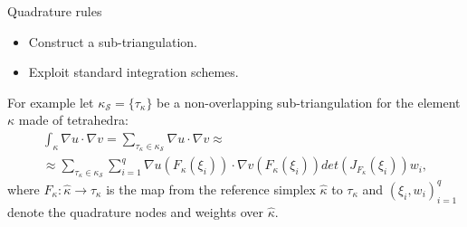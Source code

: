 \documentclass{beamer}
\begin{document}
\begin{frame}{Quadrature rules}
	\begin{itemize}
		\item Construct a sub-triangulation.
		\item Exploit standard integration schemes.
	\end{itemize}
	For example let	$\kappa_\mathcal{S} = \{\tau_\kappa\}$ be a non-overlapping 
	sub-triangulation for the element $\kappa$ made of tetrahedra:
	\begin{multline*}
	\int_\kappa \nabla u \cdot \nabla v = \sum_{\tau_\kappa \in 
	\kappa_\mathcal{S}} \nabla u \cdot \nabla v \approx\\
	\approx \sum_{\tau_\kappa \in 
	\kappa_\mathcal{S}} \sum_{i=1}^{q} \nabla u(F_\kappa(\xi_i)) \cdot \nabla 
	v(F_\kappa(\xi_i)) det(J_{F_\kappa}(\xi_i))w_i,
	\end{multline*}
	where $F_\kappa: \hat{\kappa} \rightarrow \tau_\kappa$ is the map from the 
	reference simplex $\hat{\kappa}$ to $\tau_\kappa$ and $(\xi_i, 
	w_i)^q_{i=1}$ denote the quadrature nodes and weights 
	over $\hat{\kappa}$.
\end{frame}
\end{document}
